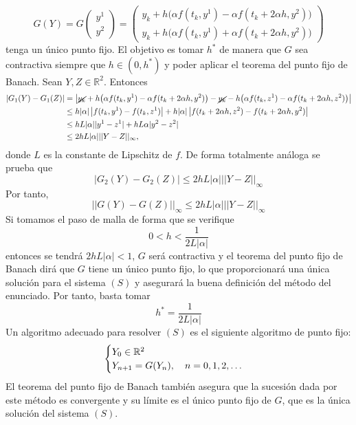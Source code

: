 \documentclass[11pt]{report}
\newcommand{\R}{\mathbb R}
\begin{document}
\begin{enumerate}
    \[G(Y) = G\left(\begin{array}{c}
        y^1 \\
        y^2
    \end{array}\right) = \left(\begin{array}{c}
        y_k+h\bigl(\alpha f(t_k,y^{1}) -\alpha f(t_k+2\alpha h,y^{2})\bigr) \\
        y_k+h\bigl(\alpha f(t_k,y^{1}) +\alpha f(t_k+2\alpha h,y^{2})\bigr)
    \end{array}\right)\]
    tenga un único punto fijo. El objetivo es tomar $h^*$ de manera que $G$ sea contractiva siempre que $h \in (0,h^*)$ y poder aplicar el teorema del punto fijo de Banach. Sean $Y,Z \in \R^2$. Entonces
    \[\begin{aligned}[t]
        |G_1(Y)-G_1(Z)| &= \left|\cancel{y_k}+h\bigl(\alpha f(t_k,y^{1}) -\alpha f(t_k+2\alpha h,y^{2})\bigr)-\cancel{y_k}-h\bigl(\alpha f(t_k,z^{1}) -\alpha f(t_k+2\alpha h,z^{2})\bigr)\right| \\
        &\leq h|\alpha| \left|f(t_k,y^1)-f(t_k,z^1)\right| + h |\alpha| \left|f(t_k+2\alpha h,z^2)-f(t_k+2\alpha h,y^2)\right| \\
        &\leq hL |\alpha| |y^1-z^1| + hL \alpha |y^2-z^2| \\
        &\leq 2hL|\alpha| ||Y-Z||_{\infty},
    \end{aligned}\]
    donde $L$ es la constante de Lipschitz de $f$. De forma totalmente análoga se prueba que
    \[|G_2(Y)-G_2(Z)| \leq 2hL |\alpha| ||Y-Z||_{\infty}\]
    Por tanto,
    \[||G(Y)-G(Z)||_{\infty} \leq 2hL|\alpha| ||Y-Z||_{\infty}\]
    Si tomamos el paso de malla de forma que se verifique
    \[0 < h < \frac{1}{2L|\alpha|}\]
    entonces se tendrá $2hL|\alpha|<1$, $G$ será contractiva y el teorema del punto fijo de Banach dirá que $G$ tiene un único punto fijo, lo que proporcionará una única solución para el sistema $(S)$ y asegurará la buena definición del método del enunciado. Por tanto, basta tomar
    \[h^*=\frac{1}{2L|\alpha|}\]
    Un algoritmo adecuado para resolver $(S)$ es el siguiente algoritmo de punto fijo:
    \[\begin{cases}
        Y_0 \in \R^2 \\
        Y_{n+1} = G(Y_n), \quad n =0,1,2,\mathellipsis
    \end{cases}\]
    El teorema del punto fijo de Banach también asegura que la sucesión dada por este método es convergente y su límite es el único punto fijo de $G$, que es la única solución del sistema $(S)$.
\end{enumerate}
\end{document}
